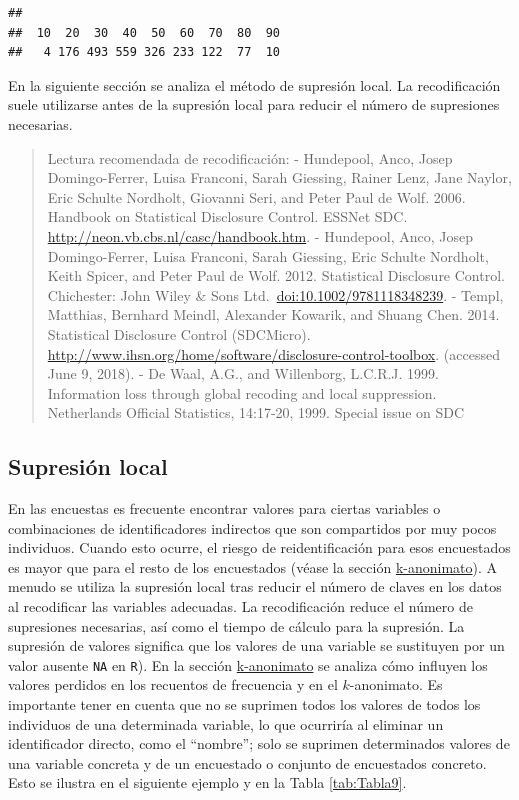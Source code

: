 \documentclass[]{book}
\theoremstyle{definition}
\theoremstyle{definition}
\theoremstyle{definition}
\theoremstyle{definition}
\theoremstyle{remark}
\begin{document}
\begin{verbatim}
## 
##  10  20  30  40  50  60  70  80  90 
##   4 176 493 559 326 233 122  77  10
\end{verbatim}

En la siguiente sección se analiza el método de supresión local. La recodificación suele utilizarse antes de la supresión local para reducir el número de supresiones necesarias.

\begin{quote}
Lectura recomendada de recodificación:
- Hundepool, Anco, Josep Domingo-Ferrer, Luisa Franconi, Sarah Giessing, Rainer Lenz, Jane Naylor, Eric Schulte Nordholt, Giovanni Seri, and Peter Paul de Wolf. 2006. Handbook on Statistical Disclosure Control. ESSNet SDC. \url{http://neon.vb.cbs.nl/casc/handbook.htm}.
- Hundepool, Anco, Josep Domingo-Ferrer, Luisa Franconi, Sarah Giessing, Eric Schulte Nordholt, Keith Spicer, and Peter Paul de Wolf. 2012. Statistical Disclosure Control. Chichester: John Wiley \& Sons Ltd.~\url{doi:10.1002/9781118348239}.
- Templ, Matthias, Bernhard Meindl, Alexander Kowarik, and Shuang Chen. 2014. Statistical Disclosure Control (SDCMicro). \url{http://www.ihsn.org/home/software/disclosure-control-toolbox}. (accessed June 9, 2018).
- De Waal, A.G., and Willenborg, L.C.R.J. 1999. Information loss through global recoding and local suppression. Netherlands Official Statistics, 14:17-20, 1999. Special issue on SDC
\end{quote}

\hypertarget{sup-loc}{%
\subsection{Supresión local}\label{sup-loc}}

En las encuestas es frecuente encontrar valores para ciertas variables o combinaciones de identificadores indirectos que son compartidos por muy pocos individuos. Cuando esto ocurre, el riesgo de reidentificación para esos encuestados es mayor que para el resto de los encuestados (véase la sección \protect\hyperlink{k-anonimato}{k-anonimato}). A menudo se utiliza la supresión local tras reducir el número de claves en los datos al recodificar las variables adecuadas. La recodificación reduce el número de supresiones necesarias, así como el tiempo de cálculo para la supresión. La supresión de valores significa que los valores de una variable se sustituyen por un valor ausente \texttt{NA} en \texttt{R}). En la sección \protect\hyperlink{k-anonimato}{k-anonimato} se analiza cómo influyen los valores perdidos en los recuentos de frecuencia y en el \(k\)-anonimato. Es importante tener en cuenta que no se suprimen todos los valores de todos los individuos de una determinada variable, lo que ocurriría al eliminar un identificador directo, como el ``nombre''; solo se suprimen determinados valores de una variable concreta y de un encuestado o conjunto de encuestados concreto. Esto se ilustra en el siguiente ejemplo y en la Tabla \ref{tab:Tabla9}.
\end{document}
